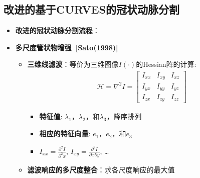 \subsection[冠状动脉分割II]{改进的基于CURVES的冠状动脉分割}

\begin{frame}
\begin{itemize}
  \item \textbf{改进的冠状动脉分割流程}：
\end{itemize}
\begin{figure}[t]
\centering

\end{figure}
\end{frame}

\begin{frame}
\begin{itemize}
\item \textbf{多尺度管状物增强~[Sato(1998)]}
\begin{itemize}
\pause \item \textbf{三维线滤波}：等价为三维图像$I(\cdot)$的Hessian阵的计算:
\begin{gather*}
\mathcal{H} = \nabla^2 I =
\begin{bmatrix}
I_{xx} & I_{xy} & I_{xz} \\ I_{yx} & I_{yy} & I_{yz} \\ I_{zx} & I_{zy} & I_{zz}
\end{bmatrix}
\end{gather*}
\begin{itemize}
\item \textbf{特征值}: $\lambda_1$，$\lambda_2$，和$\lambda_3$，降序排列
\item \textbf{相应的特征向量}: $e_1$，$e_2$，和$e_3$
\item $I_{xx} = \frac{\partial^2 I}{\partial^2 x}$, $I_{xy} = \frac{\partial^2 I}{\partial x \partial y}$, \dots
\end{itemize}
\pause \item \textbf{滤波响应的多尺度整合}：求各尺度响应的最大值
\end{itemize}
\end{itemize}
\end{frame}

